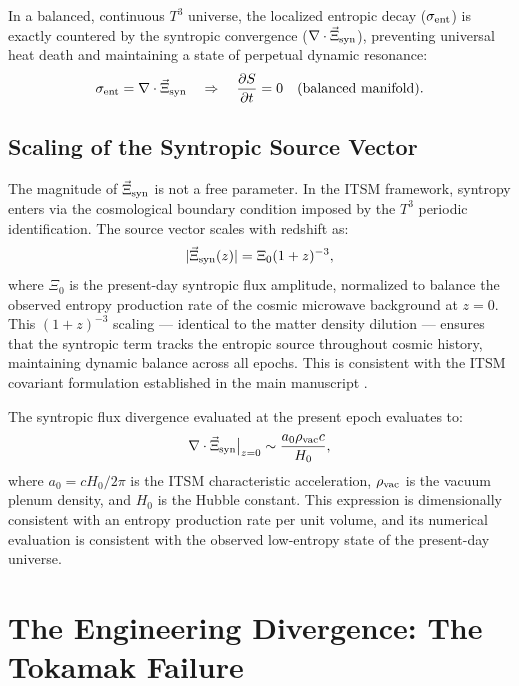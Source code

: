 \documentclass[aps,prd,11pt,onecolumn,superscriptaddress,nofootinbib,floatfix]{revtex4-2}
\begin{document}
In a balanced, continuous $T^3$ universe, the localized entropic decay ($\sigma_{\rm ent}$) is exactly countered by the syntropic convergence ($\nabla \cdot \vec{\Xi}_{\rm syn}$), preventing universal heat death and maintaining a state of perpetual dynamic resonance:
\begin{equation}
    \sigma_{\rm ent} = \nabla \cdot \vec{\Xi}_{\rm syn} \quad \Rightarrow \quad \frac{\partial S}{\partial t} = 0 \quad \text{(balanced manifold)}.
\end{equation}

\subsection{Scaling of the Syntropic Source Vector}

The magnitude of $\vec{\Xi}_{\rm syn}$ is not a free parameter. In the ITSM framework, syntropy enters via the cosmological boundary condition imposed by the $T^3$ periodic identification. The source vector scales with redshift as:
\begin{equation}
    |\vec{\Xi}_{\rm syn}(z)| = \Xi_0 (1+z)^{-3},
\end{equation}
where $\Xi_0$ is the present-day syntropic flux amplitude, normalized to balance the observed entropy production rate of the cosmic microwave background at $z=0$. This $(1+z)^{-3}$ scaling --- identical to the matter density dilution --- ensures that the syntropic term tracks the entropic source throughout cosmic history, maintaining dynamic balance across all epochs. This is consistent with the ITSM covariant formulation established in the main manuscript \cite{itsm_main}.

The syntropic flux divergence evaluated at the present epoch evaluates to:
\begin{equation}
    \nabla \cdot \vec{\Xi}_{\rm syn}\big|_{z=0} \sim \frac{a_0 \rho_{\rm vac} c}{H_0},
\end{equation}
where $a_0 = cH_0/2\pi$ is the ITSM characteristic acceleration, $\rho_{\rm vac}$ is the vacuum plenum density, and $H_0$ is the Hubble constant. This expression is dimensionally consistent with an entropy production rate per unit volume, and its numerical evaluation is consistent with the observed low-entropy state of the present-day universe.

\section{The Engineering Divergence: The Tokamak Failure}
\label{sec:divergence}
\end{document}

